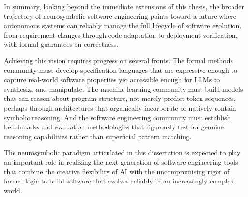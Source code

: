 In summary, looking beyond the immediate extensions of this thesis, the broader trajectory of neurosymbolic software engineering points toward a future where autonomous systems can reliably manage the full lifecycle of software evolution, from requirement changes through code adaptation to deployment verification, with formal guarantees on correctness.

Achieving this vision requires progress on several fronts. The formal methods community must develop specification languages that are expressive enough to capture real-world software properties yet accessible enough for LLMs to synthesize and manipulate. The machine learning community must build models that can reason about program structure, not merely predict token sequences, perhaps through architectures that organically incorporate or natively contain symbolic reasoning. And the software engineering community must establish benchmarks and evaluation methodologies that rigorously test for genuine reasoning capabilities rather than superficial pattern matching.

The neurosymbolic paradigm articulated in this dissertation is expected to play an important role in realizing the next generation of software engineering tools that combine the creative flexibility of AI with the uncompromising rigor of formal logic to build software that evolves reliably in an increasingly complex world.
